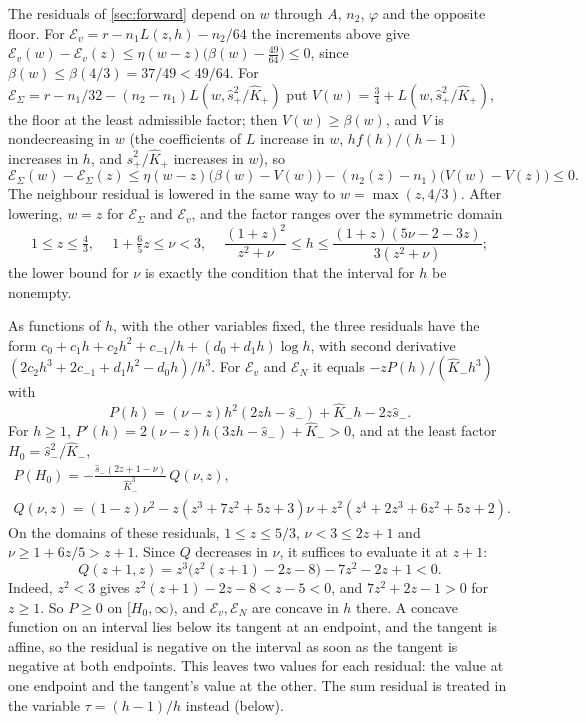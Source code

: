  The residuals of \cref{sec:forward} depend on $w$ through
$A$, $n_2$, $\varphi$ and the opposite floor. For $\mathcal E_v=r-n_1L(z,h)-n_2/64$ the increments
above give
$\mathcal E_v(w)-\mathcal E_v(z)\le\eta(w-z)\bigl(\beta(w)-\frac{49}{64}\bigr)\le0$, since
$\beta(w)\le\beta(4/3)=37/49<49/64$. For
$\mathcal E_\Sigma=r-n_1/32-(n_2-n_1)L(w,\hat s_+^2/\hat K_+)$ put $V(w)=\frac34+L(w,\hat s_+^2/\hat K_+)$,
the floor at the least admissible factor; then $V(w)\ge\beta(w)$, and $V$ is nondecreasing in $w$
(the coefficients of $L$ increase in $w$, $hf(h)/(h-1)$ increases in $h$, and
$\hat s_+^2/\hat K_+$ increases in $w$), so
\[
\mathcal E_\Sigma(w)-\mathcal E_\Sigma(z)
\le\eta(w-z)\bigl(\beta(w)-V(w)\bigr)-(n_2(z)-n_1)\bigl(V(w)-V(z)\bigr)\le0 .
\]
The neighbour residual is lowered in the same way to $w=\max(z,4/3)$. After lowering, $w=z$ for
$\mathcal E_\Sigma$ and $\mathcal E_v$, and the factor ranges over the symmetric domain
\begin{equation}\label{eq:fwd-symdomain}
1\le z\le\tfrac43,\quad\ 1+\tfrac65z\le\nu<3,\quad\
\frac{(1+z)^2}{z^2+\nu}\le h\le\frac{(1+z)(5\nu-2-3z)}{3(z^2+\nu)};
\end{equation}
the lower bound for $\nu$ is exactly the condition that the interval for $h$ be nonempty.

 As functions of $h$, with the other variables fixed, the three
residuals have the form $c_0+c_1h+c_2h^2+c_{-1}/h+(d_0+d_1h)\log h$, with second derivative
$(2c_2h^3+2c_{-1}+d_1h^2-d_0h)/h^3$. For $\mathcal E_v$ and $\mathcal E_N$ it equals
$-zP(h)/(\hat K_-h^3)$ with
\[
P(h)=(\nu-z)h^2(2zh-\hat s_-)+\hat K_-h-2z\hat s_- .
\]
For $h\ge1$, $P'(h)=2(\nu-z)h(3zh-\hat s_-)+\hat K_->0$, and at the least factor
$H_0=\hat s_-^2/\hat K_-$,
\begin{gather*}
P(H_0)=-\frac{\hat s_-(2z+1-\nu)}{\hat K_-^3}\,Q(\nu,z),\\
Q(\nu,z)=(1-z)\nu^2-z(z^3+7z^2+5z+3)\nu+z^2(z^4+2z^3+6z^2+5z+2).
\end{gather*}
On the domains of these residuals, $1\le z\le5/3$, $\nu<3\le2z+1$ and $\nu\ge1+6z/5>z+1$.
Since $Q$ decreases in $\nu$, it suffices to evaluate it at $z+1$:
\[
 Q(z+1,z)=z^3\bigl(z^2(z+1)-2z-8\bigr)-7z^2-2z+1<0.
\]
Indeed, $z^2<3$ gives $z^2(z+1)-2z-8<z-5<0$, and $7z^2+2z-1>0$ for $z\ge1$.
So $P\ge0$ on $[H_0,\infty)$, and $\mathcal E_v,\mathcal E_N$ are concave in $h$ there. A concave
function on an interval lies below its tangent at an endpoint, and the tangent is affine, so the
residual is negative on the interval as soon as the tangent is negative at both endpoints. This
leaves two values for each residual: the value at one endpoint and the tangent's value at the
other. The sum residual is treated in the variable $\tau=(h-1)/h$ instead (below).

